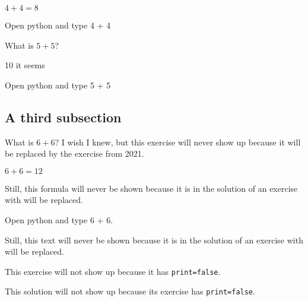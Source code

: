 \documentclass{book}
\begin{document}
\begin{solution}
  \(4 + 4 = 8\)
\end{solution}

\begin{additionalinformation}
Open python and type 4 + 4
\end{additionalinformation}

\begin{exercise}
  What is \(5 + 5\)?
\end{exercise}

\begin{solution}
10 it seems
\end{solution}

\begin{additionalinformation}
Open python and type 5 + 5
\end{additionalinformation}

\subsection{A third subsection}

\begin{exercise}[examdate={January 16, 2020}, examproblemnumber={1}, examproblemid={2020-01-16-01}, replacedbyexamproblemid={2021-01-16-01}, replacementsinceacademicyear={2025/2026}]
  What is \(6 + 6\)? I wish I knew, but this exercise will never show up because it will be replaced by the exercise from 2021.
\end{exercise}

\begin{solution}
  \(6 + 6 = 12\)

Still, this formula will never be shown because it is in the solution of an exercise with will be replaced.
\end{solution}

\begin{additionalinformation}
Open python and type 6 + 6.

Still, this text will never be shown because it is in the solution of an exercise with will be replaced.
\end{additionalinformation}

\begin{exercise}[print=false]
This exercise will not show up because it has \texttt{print=false}.
\end{exercise}

\begin{solution}
This solution will not show up because its exercise has \texttt{print=false}.
\end{solution}
\end{document}

